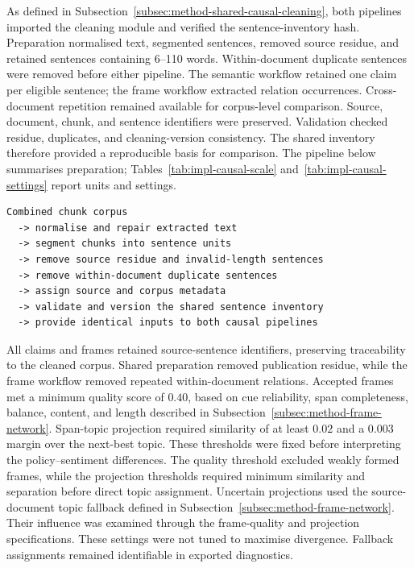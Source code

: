 As defined in Subsection~\ref{subsec:method-shared-causal-cleaning}, both pipelines
imported the cleaning module and verified the sentence-inventory hash. Preparation
normalised text, segmented sentences, removed source residue, and retained sentences
containing 6--110 words. Within-document duplicate sentences were removed before
either pipeline. The semantic workflow retained one claim per eligible sentence; the
frame workflow extracted relation occurrences. Cross-document repetition remained
available for corpus-level comparison. Source, document, chunk, and sentence
identifiers were preserved. Validation checked residue, duplicates, and
cleaning-version consistency. The shared inventory therefore provided a reproducible
basis for comparison. The pipeline below summarises preparation;
Tables~\ref{tab:impl-causal-scale} and~\ref{tab:impl-causal-settings} report units
and settings.

{\small
\begin{verbatim}
Combined chunk corpus
  -> normalise and repair extracted text
  -> segment chunks into sentence units
  -> remove source residue and invalid-length sentences
  -> remove within-document duplicate sentences
  -> assign source and corpus metadata
  -> validate and version the shared sentence inventory
  -> provide identical inputs to both causal pipelines
\end{verbatim}
}

All claims and frames retained source-sentence identifiers, preserving traceability
to the cleaned corpus. Shared preparation removed publication residue, while the
frame workflow removed repeated within-document relations. Accepted frames met a
minimum quality score of $0.40$, based on cue reliability, span completeness,
balance, content, and length described in
Subsection~\ref{subsec:method-frame-network}. Span-topic projection required
similarity of at least $0.02$ and a $0.003$ margin over the next-best topic. {\color{blue} These
thresholds were fixed before interpreting the policy--sentiment differences. The
quality threshold excluded weakly formed frames, while the projection thresholds
required minimum similarity and separation before direct topic assignment.} Uncertain
projections used the source-document topic fallback defined in
Subsection~\ref{subsec:method-frame-network}. Their influence was examined through
the frame-quality and projection specifications. These settings were not tuned to
maximise divergence. Fallback assignments remained identifiable in exported
diagnostics.


